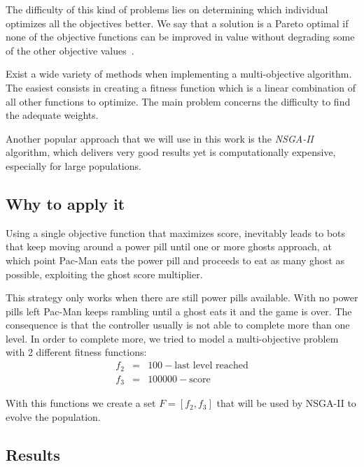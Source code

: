 \documentclass{llncs}
\newcommand{\paco}{Pac-Man }
\begin{document}
The difficulty of this kind of problems lies on determining which individual optimizes all the objectives better. We say that a solution is a Pareto optimal if none of the objective functions can be improved in value without degrading some of the other objective values~\cite{cervigon}. 

Exist a wide variety of methods when implementing a multi-objective algorithm. The easiest consists in creating a fitness function which is a linear combination of all other functions to optimize. The main problem concerns the difficulty to find the adequate weights.

Another popular approach that we will use in this work is the \textit{NSGA-II}~\cite{nsgapaper} algorithm, which delivers very good results yet is computationally expensive, especially for large populations.

\subsection{Why to apply it}

Using a single objective function that maximizes score, inevitably leads to bots that keep moving around a power pill until one or more ghosts approach, at which point \paco eats the power pill and proceeds to eat as many ghost as possible, exploiting the ghost score multiplier.

This strategy only works when there are still power pills available. With no power pills left \paco keeps rambling until a ghost eats it and the game is over. The consequence is that the controller usually is not able to complete more than one level. In order to complete more, we tried to model a multi-objective problem with 2 different fitness functions:
\begin{eqnarray*}
f_2 & = & 100 - \text{last level reached}\\
f_3 & = & 100000 - \text{score}
\end{eqnarray*}

With this functions we create a set $F = [f_2, f_3]$ that will be used by NSGA-II to evolve the population.

\subsection{Results}
\end{document}

